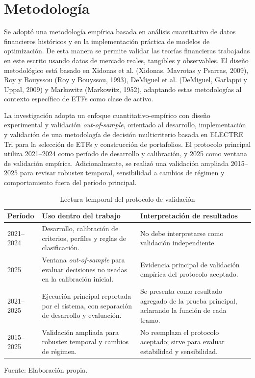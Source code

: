 \documentclass[12pt,letterpaper]{article}
\newcommand{\fuente}[1]{\begin{center}\small Fuente: #1\end{center}}
\begin{document}
\clearpage
\section{Metodología}

Se adoptó una metodología empírica basada en análisis cuantitativo de datos financieros históricos y en la implementación práctica de modelos de optimización. De esta manera se permite validar las teorías financieras trabajadas en este escrito usando datos de mercado reales, tangibles y observables. El diseño metodológico está basado en Xidonas et al. (Xidonas, Mavrotas y Psarras, 2009), Roy y Bouyssou (Roy y Bouyssou, 1993), DeMiguel et al. (DeMiguel, Garlappi y Uppal, 2009) y Markowitz (Markowitz, 1952), adaptando estas metodologías al contexto específico de ETFs como clase de activo.

La investigación adopta un enfoque cuantitativo-empírico con diseño experimental y validación \textit{out-of-sample}, orientado al desarrollo, implementación y validación de una metodología de decisión multicriterio basada en ELECTRE Tri para la selección de ETFs y construcción de portafolios. El protocolo principal utiliza 2021--2024 como período de desarrollo y calibración, y 2025 como ventana de validación empírica. Adicionalmente, se realizó una validación ampliada 2015--2025 para revisar robustez temporal, sensibilidad a cambios de régimen y comportamiento fuera del período principal.

\begin{table}[H]
\centering
\caption{Lectura temporal del protocolo de validación}
\label{tab:protocolo_temporal}
\begin{tabular}{p{3.5cm}p{5.2cm}p{5.2cm}}
\toprule
\textbf{Período} & \textbf{Uso dentro del trabajo} & \textbf{Interpretación de resultados} \\
\midrule
2021--2024 & Desarrollo, calibración de criterios, perfiles y reglas de clasificación. & No debe interpretarse como validación independiente. \\
2025 & Ventana \textit{out-of-sample} para evaluar decisiones no usadas en la calibración inicial. & Evidencia principal de validación empírica del protocolo aceptado. \\
2021--2025 & Ejecución principal reportada por el sistema, con separación de desarrollo y evaluación. & Se presenta como resultado agregado de la prueba principal, aclarando la función de cada tramo. \\
2015--2025 & Validación ampliada para robustez temporal y cambios de régimen. & No reemplaza el protocolo aceptado; sirve para evaluar estabilidad y sensibilidad. \\
\bottomrule
\end{tabular}
\end{table}
\fuente{Elaboración propia.}
\end{document}
